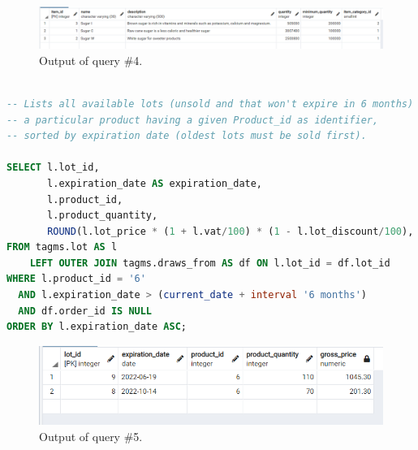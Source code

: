 \begin{figure}[h!]
	\centering
	\includegraphics[width=\linewidth]{images/q4}
	\caption{Output of query \#4.}
	\label{fig:q4}
\end{figure}

\begin{lstlisting}[language=SQL,
	keywordstyle=\color{blue},
	stringstyle=\color{mauve},
	showstringspaces=false,
	breaklines=true,
	basicstyle=\ttfamily\footnotesize]

-- Lists all available lots (unsold and that won't expire in 6 months) containing
-- a particular product having a given Product_id as identifier,
-- sorted by expiration date (oldest lots must be sold first).

SELECT l.lot_id,
       l.expiration_date AS expiration_date,
       l.product_id,
       l.product_quantity,
       ROUND(l.lot_price * (1 + l.vat/100) * (1 - l.lot_discount/100), 2) AS gross_price
FROM tagms.lot AS l
    LEFT OUTER JOIN tagms.draws_from AS df ON l.lot_id = df.lot_id
WHERE l.product_id = '6'
  AND l.expiration_date > (current_date + interval '6 months')
  AND df.order_id IS NULL
ORDER BY l.expiration_date ASC;

\end{lstlisting}

\begin{figure}[h!]
	\centering
	\includegraphics{images/q5}
	\caption{Output of query \#5.}
	\label{fig:q5}
\end{figure}

